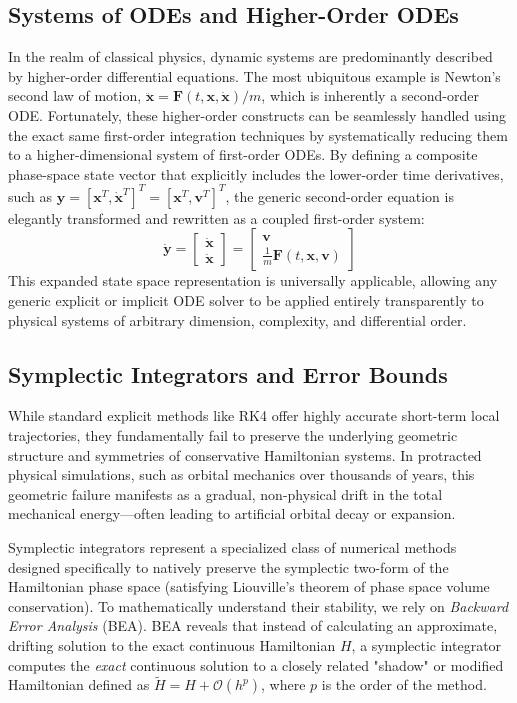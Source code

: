 \subsection{Systems of ODEs and Higher-Order ODEs}
In the realm of classical physics, dynamic systems are predominantly described by higher-order differential equations. The most ubiquitous example is Newton's second law of motion, $\ddot{\bm{x}} = \bm{F}(t, \bm{x}, \dot{\bm{x}})/m$, which is inherently a second-order ODE. 
Fortunately, these higher-order constructs can be seamlessly handled using the exact same first-order integration techniques by systematically reducing them to a higher-dimensional system of first-order ODEs. By defining a composite phase-space state vector that explicitly includes the lower-order time derivatives, such as $\bm{y} = [\bm{x}^T, \dot{\bm{x}}^T]^T = [\bm{x}^T, \bm{v}^T]^T$, the generic second-order equation is elegantly transformed and rewritten as a coupled first-order system:
\begin{equation}
    \dot{\bm{y}} = \begin{bmatrix} \dot{\bm{x}} \\ \ddot{\bm{x}} \end{bmatrix} = \begin{bmatrix} \bm{v} \\ \frac{1}{m}\bm{F}(t, \bm{x}, \bm{v}) \end{bmatrix}
\end{equation}
This expanded state space representation is universally applicable, allowing any generic explicit or implicit ODE solver to be applied entirely transparently to physical systems of arbitrary dimension, complexity, and differential order.

\subsection{Symplectic Integrators and Error Bounds}
While standard explicit methods like RK4 offer highly accurate short-term local trajectories, they fundamentally fail to preserve the underlying geometric structure and symmetries of conservative Hamiltonian systems. In protracted physical simulations, such as orbital mechanics over thousands of years, this geometric failure manifests as a gradual, non-physical drift in the total mechanical energy—often leading to artificial orbital decay or expansion. 

Symplectic integrators represent a specialized class of numerical methods designed specifically to natively preserve the symplectic two-form of the Hamiltonian phase space (satisfying Liouville's theorem of phase space volume conservation). To mathematically understand their stability, we rely on \textit{Backward Error Analysis} (BEA). BEA reveals that instead of calculating an approximate, drifting solution to the exact continuous Hamiltonian $H$, a symplectic integrator computes the \textit{exact} continuous solution to a closely related "shadow" or modified Hamiltonian defined as $\tilde{H} = H + \mathcal{O}(h^p)$, where $p$ is the order of the method. 

